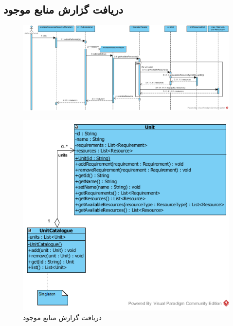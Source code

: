 \begin{landscape}
\section{دریافت گزارش منابع موجود}
\begin{figure}[H]
	\centering
	\includegraphics[scale=0.7]{img/sequence-design/AvailableResourcesReport}
\end{figure}
\begin{figure}[H]
	\centering
	\includegraphics[scale=0.7]{img/sequence-design/AvailableResourcesReportC}
	\caption{دریافت گزارش منابع موجود}
\end{figure}

\newpage

\end{landscape}
